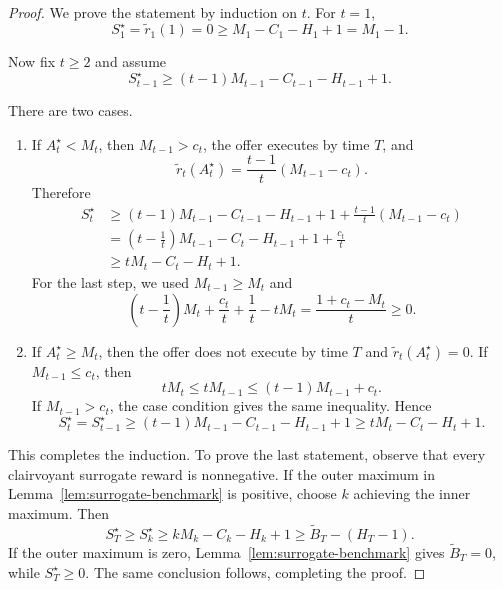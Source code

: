 \documentclass[11pt]{article}
\theoremstyle{definition}
\begin{document}
\begin{proof}
We prove the statement by induction on $t$. For $t=1$,
\[
    S_1^\star
    =
    \widetilde r_1(1)
    =
    0
    \ge
    M_1-C_1-H_1+1
    =
    M_1-1.
\]

Now fix $t\ge2$ and assume
\[
    S_{t-1}^\star
    \ge
    (t-1)M_{t-1}-C_{t-1}-H_{t-1}+1.
\]

There are two cases.
\begin{enumerate}
    \item If $A_t^\star<M_t$, then $M_{t-1}>c_t$, the offer executes by
    time $T$, and
    \[
        \widetilde r_t(A_t^\star)
        =
        \frac{t-1}{t}(M_{t-1}-c_t).
    \]
    Therefore
    \begin{align*}
        S_t^\star
        &\ge
        (t-1)M_{t-1}-C_{t-1}-H_{t-1}+1
        +\frac{t-1}{t}(M_{t-1}-c_t)
        \\
        &=
        \left(t-\frac1t\right)M_{t-1}
        -C_t-H_{t-1}+1+\frac{c_t}{t}
        \\
        &\ge
        tM_t-C_t-H_t+1.
    \end{align*}
    For the last step, we used $M_{t-1}\ge M_t$ and
    \[
        \left(t-\frac1t\right)M_t
        +\frac{c_t}{t}
        +\frac1t
        -tM_t
        =
        \frac{1+c_t-M_t}{t}
        \ge0.
    \]

    \item If $A_t^\star\ge M_t$, then the offer does not execute by time
    $T$ and $\widetilde r_t(A_t^\star)=0$. If
    $M_{t-1}\le c_t$, then
    \[
        tM_t
        \le
        tM_{t-1}
        \le
        (t-1)M_{t-1}+c_t.
    \]
    If $M_{t-1}>c_t$, the case condition gives the same inequality.
    Hence
    \[
        S_t^\star
        =
        S_{t-1}^\star
        \ge
        (t-1)M_{t-1}-C_{t-1}-H_{t-1}+1
        \ge
        tM_t-C_t-H_t+1.
    \]
\end{enumerate}

This completes the induction. To prove the last statement, observe that
every clairvoyant surrogate reward is nonnegative. If the outer maximum
in Lemma~\ref{lem:surrogate-benchmark} is positive, choose $k$ achieving
the inner maximum. Then
\[
    S_T^\star
    \ge
    S_k^\star
    \ge
    kM_k-C_k-H_k+1
    \ge
    \widetilde B_T-(H_T-1).
\]
If the outer maximum is zero,
Lemma~\ref{lem:surrogate-benchmark} gives $\widetilde B_T=0$, while
$S_T^\star\ge0$. The same conclusion follows, completing the proof.
\end{proof}
\end{document}
